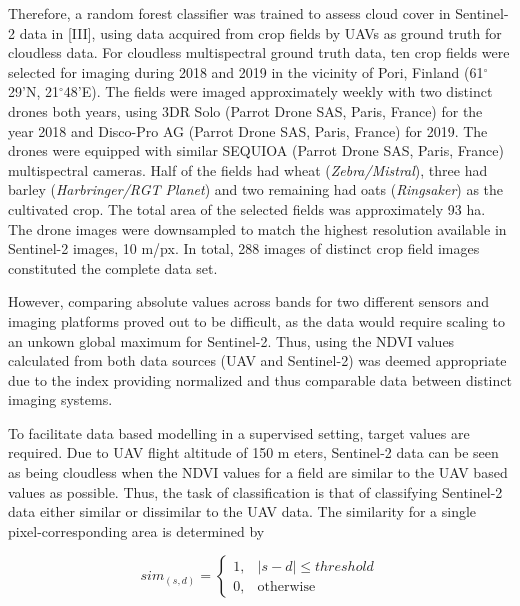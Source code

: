 Therefore, a random forest classifier was trained to assess cloud cover in Sentinel-2 data in [III], using data acquired from crop fields by UAVs as ground truth for cloudless data. For cloudless multispectral ground truth data, ten crop fields were selected for imaging during 2018 and 2019 in the vicinity of Pori, Finland (61$^\circ$29'N, 21$^\circ$48'E). The fields were imaged approximately weekly with two distinct drones both years, using 3DR Solo (Parrot Drone SAS, Paris, France) for the year 2018 and Disco-Pro AG (Parrot Drone SAS, Paris, France) for 2019. The drones were equipped with similar SEQUIOA (Parrot Drone SAS, Paris, France) multispectral cameras. Half of the fields had wheat (\textit{Zebra/Mistral}), three had barley (\textit{Harbringer/RGT Planet}) and two remaining had oats (\textit{Ringsaker}) as the cultivated crop. The total area of the selected fields was approximately 93 ha. The drone images were downsampled to match the highest resolution available in Sentinel-2 images, 10 m/px. In total, 288 images of distinct crop field images constituted the complete data set.

However, comparing absolute values across bands for two different sensors and imaging platforms proved out to be difficult, as the data would require scaling to an unkown global maximum for Sentinel-2. Thus, using the NDVI values calculated from both data sources (UAV and Sentinel-2) was deemed appropriate due to the index providing normalized and thus comparable data between distinct imaging systems.

To facilitate data based modelling in a supervised setting, target values are required. Due to UAV flight altitude of 150 m eters, Sentinel-2 data can be seen as being cloudless when the NDVI values for a field are similar to the UAV based values as possible. Thus, the task of classification is that of classifying Sentinel-2 data either similar or dissimilar to the UAV data. The similarity for a single pixel-corresponding area is determined by

\begin{equation}
    sim_{(s,d)} = \begin{cases}  1, & |s-d| \leq threshold \\ 
    0, & \mbox{otherwise} 
    \end{cases}
    \label{eq:iii-similarity}
\end{equation}

